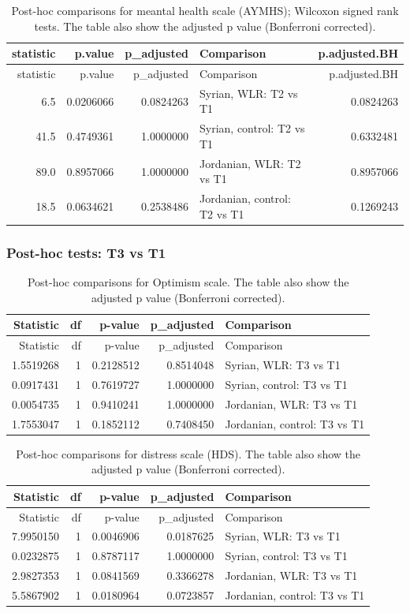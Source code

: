 \documentclass[]{article}
\begin{document}
\begin{longtable}[]{@{}rrrlr@{}}
\caption{Post-hoc comparisons for meantal health scale (AYMHS); Wilcoxon
signed rank tests. The table also show the adjusted p value (Bonferroni
corrected).}\tabularnewline
\toprule
statistic & p.value & p\_adjusted & Comparison &
p.adjusted.BH\tabularnewline
\midrule
\endfirsthead
\toprule
statistic & p.value & p\_adjusted & Comparison &
p.adjusted.BH\tabularnewline
\midrule
\endhead
6.5 & 0.0206066 & 0.0824263 & Syrian, WLR: T2 vs T1 &
0.0824263\tabularnewline
41.5 & 0.4749361 & 1.0000000 & Syrian, control: T2 vs T1 &
0.6332481\tabularnewline
89.0 & 0.8957066 & 1.0000000 & Jordanian, WLR: T2 vs T1 &
0.8957066\tabularnewline
18.5 & 0.0634621 & 0.2538486 & Jordanian, control: T2 vs T1 &
0.1269243\tabularnewline
\bottomrule
\end{longtable}

\newpage

\hypertarget{post-hoc-tests-t3-vs-t1}{%
\subsubsection{Post-hoc tests: T3 vs T1}\label{post-hoc-tests-t3-vs-t1}}

\begin{longtable}[]{@{}rrrrl@{}}
\caption{Post-hoc comparisons for Optimism scale. The table also show
the adjusted p value (Bonferroni corrected).}\tabularnewline
\toprule
Statistic & df & p-value & p\_adjusted & Comparison\tabularnewline
\midrule
\endfirsthead
\toprule
Statistic & df & p-value & p\_adjusted & Comparison\tabularnewline
\midrule
\endhead
1.5519268 & 1 & 0.2128512 & 0.8514048 & Syrian, WLR: T3 vs
T1\tabularnewline
0.0917431 & 1 & 0.7619727 & 1.0000000 & Syrian, control: T3 vs
T1\tabularnewline
0.0054735 & 1 & 0.9410241 & 1.0000000 & Jordanian, WLR: T3 vs
T1\tabularnewline
1.7553047 & 1 & 0.1852112 & 0.7408450 & Jordanian, control: T3 vs
T1\tabularnewline
\bottomrule
\end{longtable}

\begin{longtable}[]{@{}rrrrl@{}}
\caption{Post-hoc comparisons for distress scale (HDS). The table also
show the adjusted p value (Bonferroni corrected).}\tabularnewline
\toprule
Statistic & df & p-value & p\_adjusted & Comparison\tabularnewline
\midrule
\endfirsthead
\toprule
Statistic & df & p-value & p\_adjusted & Comparison\tabularnewline
\midrule
\endhead
7.9950150 & 1 & 0.0046906 & 0.0187625 & Syrian, WLR: T3 vs
T1\tabularnewline
0.0232875 & 1 & 0.8787117 & 1.0000000 & Syrian, control: T3 vs
T1\tabularnewline
2.9827353 & 1 & 0.0841569 & 0.3366278 & Jordanian, WLR: T3 vs
T1\tabularnewline
5.5867902 & 1 & 0.0180964 & 0.0723857 & Jordanian, control: T3 vs
T1\tabularnewline
\bottomrule
\end{longtable}
\end{document}
